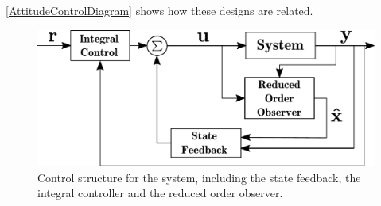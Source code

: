 \autoref{AttitudeControlDiagram} shows how these designs are related.
\begin{figure}[H]
    \centering
    \includegraphics[scale=0.25]{figures/AttitudeControlDiagram}
    \caption{ Control structure for the system, including the state feedback, the integral controller and the reduced order observer.}
    \label{AttitudeControlDiagram}
\end{figure}

